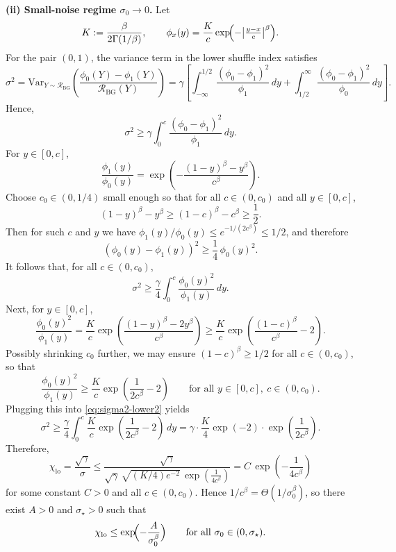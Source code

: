 \documentclass{article}
\theoremstyle{plain}
\theoremstyle{definition}
\begin{document}
\noindent\textbf{(ii) Small-noise regime $\sigma_0\to 0$.}
Let
\[
K:=\frac{\beta}{2\Gamma(1/\beta)},\qquad
\phi_x(y)=\frac{K}{c}\exp\!\Bigl(-\bigl|\tfrac{y-x}{c}\bigr|^\beta\Bigr).
\]
For the pair $(0,1)$, the variance term in the lower shuffle index satisfies
\begin{equation}\label{eq:sigma2-lower}
\sigma^2
=
\mathrm{Var}_{Y\sim \mathcal R_{\mathrm{BG}}}\!\left(\frac{\phi_0(Y)-\phi_1(Y)}{\mathcal R_{\mathrm{BG}}(Y)}\right)
=
\gamma\left[
\int_{-\infty}^{1/2}\frac{(\phi_0-\phi_1)^2}{\phi_1}\,dy
+
\int_{1/2}^{\infty}\frac{(\phi_0-\phi_1)^2}{\phi_0}\,dy
\right].
\end{equation}
Hence,
\[
\sigma^2 \ge \gamma\int_0^c \frac{(\phi_0-\phi_1)^2}{\phi_1}\,dy.
\]
For $y\in[0,c]$,
\[
\frac{\phi_1(y)}{\phi_0(y)}
=
\exp\!\left(-\frac{(1-y)^\beta-y^\beta}{c^\beta}\right).
\]
Choose $c_0\in(0,1/4)$ small enough so that for all $c\in(0,c_0)$ and all $y\in[0,c]$,
\[
(1-y)^\beta-y^\beta \ge (1-c)^\beta-c^\beta \ge \frac12.
\]
Then for such $c$ and $y$ we have $\phi_1(y)/\phi_0(y)\le e^{-1/(2c^\beta)}\le 1/2$, and therefore
\[
(\phi_0(y)-\phi_1(y))^2 \ge \frac14\,\phi_0(y)^2.
\]
It follows that, for all $c\in(0,c_0)$,
\begin{equation}\label{eq:sigma2-lower2}
\sigma^2
\ge
\frac{\gamma}{4}\int_0^c \frac{\phi_0(y)^2}{\phi_1(y)}\,dy.
\end{equation}
Next, for $y\in[0,c]$,
\[
\frac{\phi_0(y)^2}{\phi_1(y)}
=
\frac{K}{c}\exp\!\left(\frac{(1-y)^\beta-2y^\beta}{c^\beta}\right)
\ge
\frac{K}{c}\exp\!\left(\frac{(1-c)^\beta}{c^\beta}-2\right).
\]
Possibly shrinking $c_0$ further, we may ensure $(1-c)^\beta\ge 1/2$ for all $c\in(0,c_0)$, so that
\[
\frac{\phi_0(y)^2}{\phi_1(y)}
\ge
\frac{K}{c}\exp\!\left(\frac{1}{2c^\beta}-2\right)
\qquad \text{for all }y\in[0,c],\ c\in(0,c_0).
\]
Plugging this into \eqref{eq:sigma2-lower2} yields
\[
\sigma^2
\ge
\frac{\gamma}{4}\int_0^c \frac{K}{c}\exp\!\left(\frac{1}{2c^\beta}-2\right)\,dy
=
\gamma\cdot \frac{K}{4}\exp(-2)\cdot \exp\!\left(\frac{1}{2c^\beta}\right).
\]
Therefore,
\[
\chi_{\mathrm{lo}}=\frac{\sqrt{\gamma}}{\sigma}
\le
\frac{\sqrt{\gamma}}{\sqrt{\gamma}\,\sqrt{(K/4)e^{-2}}\,\exp\!\left(\frac{1}{4c^\beta}\right)}
=
C\,\exp\!\left(-\frac{1}{4c^\beta}\right)
\]
for some constant $C>0$ and all $c\in(0,c_0)$.
Hence $1/c^\beta = \Theta(1/\sigma_0^\beta)$, so there exist $A>0$ and $\sigma_\star>0$ such that
\[
\chi_{\mathrm{lo}} \le \exp\!\Bigl(-\frac{A}{\sigma_0^\beta}\Bigr)
\qquad\text{for all }\sigma_0\in(0,\sigma_\star).
\]
\end{document}

